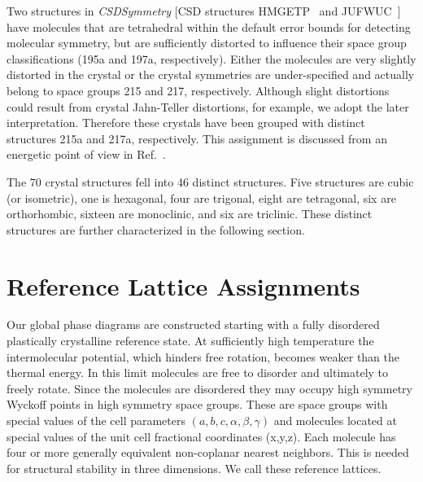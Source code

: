 \documentclass[preprint]{revtex4}              %
\begin{document}
Two structures in \emph{CSDSymmetry} [CSD structures
HMGETP~\cite{Dahl75} and JUFWUC~\cite{Tesh92}] have molecules that
are tetrahedral within the default error bounds for detecting
molecular symmetry, but are sufficiently distorted to influence
their space group classifications (195a and 197a, respectively).
Either the molecules are very slightly distorted in the crystal or
the crystal symmetries are under-specified and actually belong to
space groups 215 and 217, respectively. Although slight distortions
could result from crystal Jahn-Teller distortions, for example, we
adopt the later interpretation. Therefore these crystals have been
grouped with distinct structures 215a and 217a, respectively. This
assignment is discussed from an energetic point of view in
Ref.~\cite{Keith06b}.

The 70 crystal structures fell into 46 distinct structures. Five
structures are cubic (or isometric), one is hexagonal, four are
trigonal, eight are tetragonal, six are orthorhombic, sixteen are
monoclinic, and six are triclinic. These distinct structures are
further characterized in the following section.

\section{Reference Lattice Assignments}
\label{assignments}

Our global phase diagrams are constructed starting with a fully
disordered plastically crystalline reference state.  At sufficiently
high temperature the intermolecular potential, which hinders free
rotation, becomes weaker than the thermal energy.  In this limit
molecules are free to disorder and ultimately to freely rotate.
Since the molecules are disordered they may occupy high symmetry
Wyckoff points in high symmetry space groups. These are space groups
with special values of the cell parameters
$(a,b,c,\alpha,\beta,\gamma)$ and molecules located at special
values of the unit cell fractional coordinates (x,y,z). Each
molecule has four or more generally equivalent non-coplanar nearest
neighbors. This is needed for structural stability in three
dimensions. We call these reference lattices.
\end{document}
